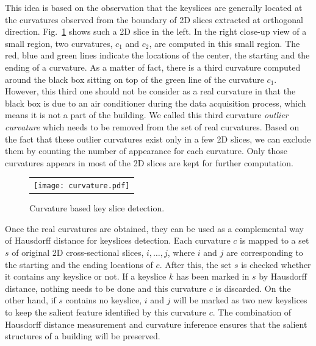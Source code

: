\documentclass{acmsiggraph}                     %
\newcommand{\Fig}[1]{Fig.~\ref{fig:#1}}
\begin{document}
This idea is based on the observation that the keyslices are generally
located at the curvatures observed from the boundary of 2D slices extracted
at orthogonal direction. \Fig{HT_BPA_Curvature} shows such a 2D slice in the left.
In the right close-up view of a small region, two curvatures, $c_1$ and $c_2$, are
computed in this small region. The red, blue and green lines indicate the locations
of the center, the starting and the ending of a curvature. 
As a matter of fact, there is a third curvature computed around the
black box sitting on top of the green line of the curvature $c_1$. 
However, this third one should not be consider as a real curvature 
in that the black box is due to an air conditioner during the data acquisition process, 
which means it is not a part of the building. We called this third curvature
{\it outlier curvature} which needs to be removed from the set of real curvatures.
Based on the fact that these outlier curvatures exist only in a few 2D slices,
we can exclude them by counting the number of appearance for each curvature.
Only those curvatures appears in most of the 2D slices are kept for further computation.

\begin{figure}[htbp]
\begin{center}
\begin{tabular}{c}
\texttt{[image: curvature.pdf]}
\end{tabular}
\end{center}
\caption{ Curvature based key slice detection. }
\label{fig:HT_BPA_Curvature}
\end{figure}

Once the real curvatures are obtained, they can be used as a complemental way of 
Hausdorff distance for keyslices detection. 
Each curvature $c$ is mapped to a set $s$ of original 2D cross-sectional
slices, $i,\ldots,j$, where $i$ and $j$ are corresponding to the starting and 
the ending locations of $c$. After this, the set $s$ is checked whether 
it contains any keyslice or not.
If a keyslice $k$ has been marked in $s$ by Hausdorff distance, 
nothing needs to be done and this curvature $c$ is discarded. 
On the other hand, if $s$ contains no keyslice, $i$ and $j$ will be marked as 
two new keyslices to keep the salient feature identified by this curvature $c$.
The combination of Hausdorff distance measurement and curvature inference
ensures that the salient structures of a building will be preserved.
\end{document}
